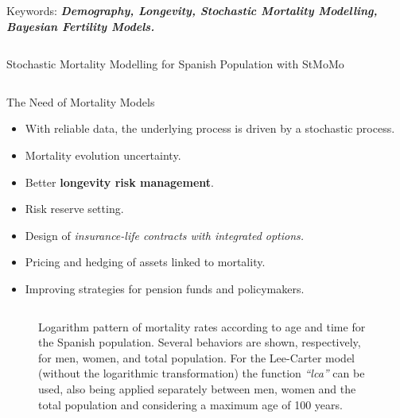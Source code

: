 \documentclass[]{beamer}
\begin{document}
\begin{frame}{\vspace{1ex}\hfill Keywords: \bfseries \textit{Demography, Longevity, Stochastic Mortality Modelling, Bayesian Fertility Models.}}
\begin{columns}[t]
\begin{block}{Stochastic Mortality Modelling for Spanish Population with StMoMo}
\begin{columns}[t]
\begin{block}{The Need of Mortality Models}
\begin{itemize}
						\item With reliable data, the underlying process is driven by a stochastic process.
						\item Mortality evolution uncertainty.
						\item Better \textbf{longevity risk management}.
						\item Risk reserve setting.
						\item Design of \textit{insurance-life contracts with integrated options.}
						\item Pricing and hedging of assets ​​linked to mortality.
						\item Improving strategies for pension funds and policymakers.																		%
					\end{itemize}
				\end{block}
			\end{columns}
			\vspace{-1cm}
			\begin{figure}[h]
				\centering
					\caption{\small  Logarithm pattern of mortality rates according to age and time for the Spanish population. Several behaviors are shown, respectively, for men, women, and total population. For the Lee-Carter model (without the logarithmic transformation) the  function \textit{``lca''} can be used, also being applied separately between men, women and the total population and considering a maximum age of 100 years.}

\end{figure}
\end{block}
\end{columns}
\end{frame}
\end{document}
